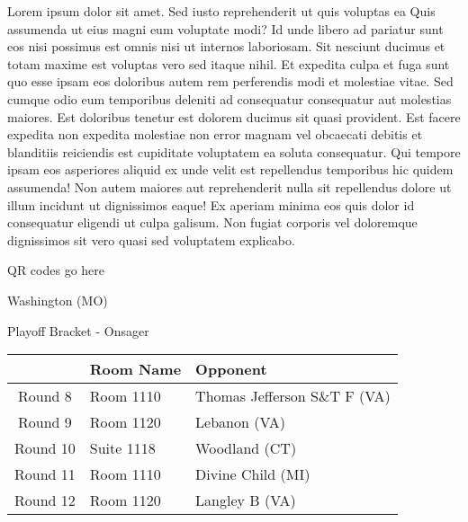 \documentclass{article}%
\begin{document}
\vspace*{8pt}%
\linebreak%
\newline%
\newline%
Lorem ipsum dolor sit amet. Sed iusto reprehenderit ut quis voluptas ea Quis assumenda ut eius magni eum voluptate modi? Id unde libero ad pariatur sunt eos nisi possimus est omnis nisi ut internos laboriosam. Sit nesciunt ducimus et totam maxime est voluptas vero sed itaque nihil. Et expedita culpa et fuga sunt quo esse ipsam eos doloribus autem rem perferendis modi et molestiae vitae.\newline%
\newline%
Sed cumque odio eum temporibus deleniti ad consequatur consequatur aut molestias maiores. Est doloribus tenetur est dolorem ducimus sit quasi provident. Est facere expedita non expedita molestiae non error magnam vel obcaecati debitis et blanditiis reiciendis est cupiditate voluptatem ea soluta consequatur. Qui tempore ipsam eos asperiores aliquid ex unde velit est repellendus temporibus hic quidem assumenda!\newline%
\newline%
Non autem maiores aut reprehenderit nulla sit repellendus dolore ut illum incidunt ut dignissimos eaque! Ex aperiam minima eos quis dolor id consequatur eligendi ut culpa galisum. Non fugiat corporis vel doloremque dignissimos sit vero quasi sed voluptatem explicabo.\newline%
\newline%
%
\vspace*{30pt}%
\begin{center}%
\begin{Huge}%
QR codes go here%
\end{Huge}%
\end{center}%
\newpage%
\begin{center}%
\begin{Huge}%
Washington (MO)%
\end{Huge}%
\vspace*{8pt}%
\linebreak%
\begin{Large}%
Playoff Bracket {-} Onsager%
\end{Large}%
\end{center}%
%
\begin{tabularx}{\textwidth}{|c|Y|Y|}%
\hline%
&Room Name&Opponent\\%
\hline%
Round 8&Room 1110&Thomas Jefferson S\&T F (VA)\\%
Round 9&Room 1120&Lebanon (VA)\\%
Round 10&Suite 1118&Woodland (CT)\\%
Round 11&Room 1110&Divine Child (MI)\\%
Round 12&Room 1120&Langley B (VA)\\%
\hline%
\end{tabularx}%
\end{document}
